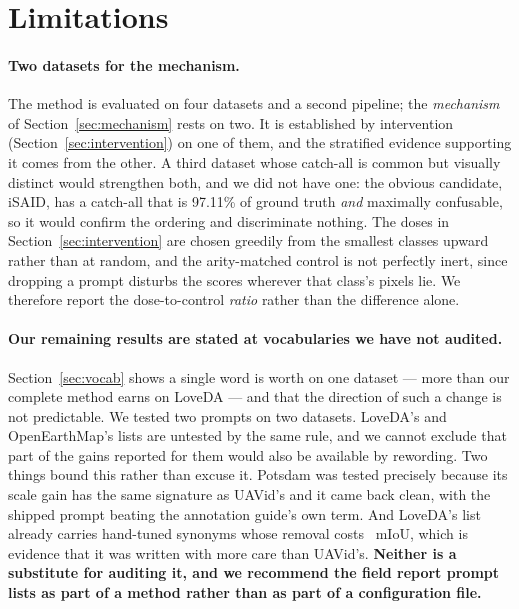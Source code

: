 \documentclass[10pt,a4paper]{article}                        %
\newcommand{\best}[1]{\textbf{#1}}
\begin{document}
\section{Limitations}
\label{sec:limitations}

\paragraph{Two datasets for the mechanism.} The method is evaluated on four
datasets and a second pipeline; the \emph{mechanism} of Section~\ref{sec:mechanism}
rests on two. It is established by intervention
(Section~\ref{sec:intervention}) on one of them, and the stratified evidence
supporting it comes from the other. A third dataset whose catch-all is common but
visually distinct would strengthen both, and we did not have one: the obvious
candidate, iSAID, has a catch-all that is 97.11\% of ground truth \emph{and}
maximally confusable, so it would confirm the ordering and discriminate nothing.
The doses in Section~\ref{sec:intervention} are chosen greedily from the smallest
classes upward rather than at random, and the arity-matched control is not
perfectly inert, since dropping a prompt disturbs the scores wherever that class's
pixels lie. We therefore report the dose-to-control \emph{ratio} rather than the
difference alone.

\paragraph{\best{Our remaining results are stated at vocabularies we have not
audited.}} Section~\ref{sec:vocab} shows a single word is worth \vocUavGain{} on one
dataset --- more than our complete method earns on LoveDA --- and that the direction
of such a change is not predictable. We tested two prompts on two datasets. LoveDA's
and OpenEarthMap's lists are untested by the same rule, and we cannot exclude that
part of the gains reported for them would also be available by rewording. Two things
bound this rather than excuse it. Potsdam was tested precisely because its scale gain
has the same signature as UAVid's and it came back clean, with the shipped prompt
beating the annotation guide's own term. And LoveDA's list already carries hand-tuned
synonyms whose removal costs \vocLoveBarren{}~mIoU, which is evidence that it was
written with more care than UAVid's. \best{Neither is a substitute for auditing it,
and we recommend the field report prompt lists as part of a method rather than as
part of a configuration file.}
\end{document}
